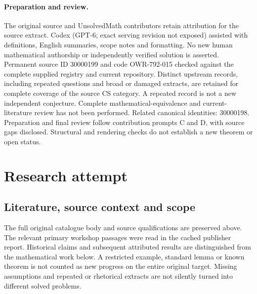 \documentclass[11pt]{article}
\begin{document}
\paragraph{Preparation and review.}
The original source and UnsolvedMath contributors retain attribution for the source extract. Codex (GPT-6; exact serving revision not exposed) assisted with definitions, English summaries, scope notes and formatting. No new human mathematical authorship or independently verified solution is asserted. Permanent source ID 30000199 and code OWR-792-015 checked against the complete supplied registry and current repository. Distinct upstream records, including repeated questions and broad or damaged extracts, are retained for complete coverage of the source CS category. A repeated record is not a new independent conjecture. Complete mathematical-equivalence and current-literature review has not been performed. Related canonical identities: 30000198. Preparation and final review follow contribution prompts C and D, with source gaps disclosed. Structural and rendering checks do not establish a new theorem or open status.
\label{end:30000199}

\section{Research attempt}
\subsection{Literature, source context and scope}
The full original catalogue body and source qualifications are preserved above. The relevant primary workshop passages were read in the cached publisher report. Historical claims and subsequent attributed results are distinguished from the mathematical work below. A restricted example, standard lemma or known theorem is not counted as new progress on the entire original target. Missing assumptions and repeated or rhetorical extracts are not silently turned into different solved problems.
\end{document}
